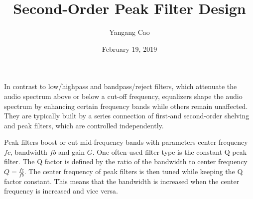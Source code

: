 \documentclass[10pt,a4paper,oneside]{article}
\author{Yangang Cao}
\date{February 19, 2019}
\begin{document}
\title{Second-Order Peak Filter Design}
\maketitle 
In contrast to low/highpass and bandpass/reject filters, which attenuate the audio spectrum above or below a cut-off frequency, equalizers shape the audio spectrum by enhancing certain frequency bands while others remain unaffected. They are typically built by a series connection of first-and second-order shelving and peak filters, which are controlled independently.

Peak filters boost or cut mid-frequency bands with parameters center frequency $fc$,
bandwidth $fb$ and gain $G$. One often-used filter type is the constant Q peak filter. The Q factor is defined by the ratio of the bandwidth to center frequency $Q = \frac{fc}{fb}$. The center frequency of peak filters is then tuned while keeping the Q factor constant. This means that the bandwidth is increased when the center frequency is increased and vice versa.
\end{document}

